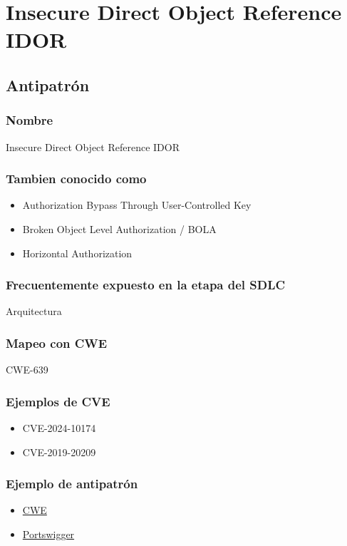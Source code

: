 \chapter{Insecure Direct Object Reference IDOR}
\section{Antipatrón}
\subsection*{Nombre}
Insecure Direct Object Reference IDOR
\subsection*{Tambien conocido como}
\begin{itemize}
    \item Authorization Bypass Through User-Controlled Key
    \item Broken Object Level Authorization / BOLA
    \item Horizontal Authorization
\end{itemize}
\subsection*{Frecuentemente expuesto en la etapa del SDLC}
Arquitectura
\subsection*{Mapeo con CWE}
CWE-639
\subsection*{Ejemplos de CVE}
\begin{itemize}
    \item CVE-2024-10174
    \item CVE-2019-20209
\end{itemize}
\subsection*{Ejemplo de antipatrón}
\begin{itemize}
    \item \href{https://cwe.mitre.org/data/definitions/639.html}{CWE}
    \item \href{https://portswigger.net/web-security/access-control/idor}{Portswigger}
\end{itemize}
